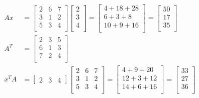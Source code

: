 \documentclass[12pt, border = 4pt, multi]{article} %
\begin{document}
\begin{align*}
Ax &=
\begin{bmatrix}
2 & 6 & 7\\
3 & 1 & 2\\
5 & 3 & 4\\
\end{bmatrix}
\begin{bmatrix}
2\\
3\\
4\\
\end{bmatrix}
=
\begin{bmatrix}
4 + 18 + 28\\
6 + 3 + 8\\
10 + 9 + 16\\
\end{bmatrix}
=
\begin{bmatrix}
50\\
17\\
35\\
\end{bmatrix}\\
A ^ T &=
\begin{bmatrix}
2 & 3 & 5\\
6 & 1 & 3\\
7 & 2 & 4\\
\end{bmatrix}\\
x ^ T A &=
\begin{bmatrix}
2 & 3 & 4
\end{bmatrix}
\begin{bmatrix}
2 & 6 & 7\\
3 & 1 & 2\\
5 & 3 & 4\\
\end{bmatrix}
=
\begin{bmatrix}
4 + 9 + 20\\
12 + 3 + 12\\
14 + 6 + 16\\
\end{bmatrix}
=
\begin{bmatrix}
33\\
27\\
36\\
\end{bmatrix}
\end{align*}
\end{document}
